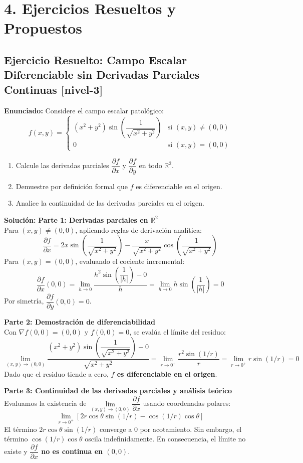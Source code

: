 \documentclass[11pt]{article}
\newenvironment{ejercicios}{%
  \section*{4. Ejercicios Resueltos y Propuestos}%
}{}
\newenvironment{ejercicioresuelto}[2]{\subsection*{Ejercicio Resuelto: #1 \small{[#2]}}}{}
\newcommand{\enunciado}[1]{\textbf{Enunciado:} #1\par\vspace{0.2cm}}
\newcommand{\solucion}[1]{\textbf{Solución:} #1\par\vspace{0.4cm}}
\begin{document}
\begin{ejercicios}
  \begin{ejercicioresuelto}{Campo Escalar Diferenciable sin Derivadas Parciales Continuas}{nivel-3}
    \enunciado{
      Considere el campo escalar patológico:
      $$ f(x,y) = \begin{cases} \left(x^2 + y^2\right) \sin\left(\dfrac{1}{\sqrt{x^2 + y^2}}\right) & \text{si } (x,y) \neq (0,0) \\[1em] 0 & \text{si } (x,y) = (0,0) \end{cases} $$
      \begin{enumerate}
        \item Calcule las derivadas parciales $\dfrac{\partial f}{\partial x}$ y $\dfrac{\partial f}{\partial y}$ en todo $\mathbb{R}^2$.
        \item Demuestre por definición formal que $f$ es diferenciable en el origen.
        \item Analice la continuidad de las derivadas parciales en el origen.
      \end{enumerate}
    }
    \solucion{
      \textbf{Parte 1: Derivadas parciales en $\mathbb{R}^2$} \\
      Para $(x,y) \neq (0,0)$, aplicando reglas de derivación analítica:
      $$ \dfrac{\partial f}{\partial x} = 2x\sin\left(\dfrac{1}{\sqrt{x^2+y^2}}\right) - \dfrac{x}{\sqrt{x^2+y^2}}\cos\left(\dfrac{1}{\sqrt{x^2+y^2}}\right) $$
      Para $(x,y) = (0,0)$, evaluando el cociente incremental:
      $$ \dfrac{\partial f}{\partial x}(0,0) = \lim\limits_{h \to 0} \dfrac{h^2 \sin\left(\dfrac{1}{|h|}\right) - 0}{h} = \lim\limits_{h \to 0} h \sin\left(\dfrac{1}{|h|}\right) = 0 $$
      Por simetría, $\dfrac{\partial f}{\partial y}(0,0) = 0$.

      \vspace{0.3cm}
      \textbf{Parte 2: Demostración de diferenciabilidad} \\
      Con $\nabla f(0,0) = (0,0)$ y $f(0,0)=0$, se evalúa el límite del residuo:
      $$ \lim\limits_{(x,y) \to (0,0)} \dfrac{(x^2+y^2)\sin\left(\dfrac{1}{\sqrt{x^2+y^2}}\right) - 0}{\sqrt{x^2+y^2}} = \lim\limits_{r \to 0^+} \dfrac{r^2 \sin(1/r)}{r} = \lim\limits_{r \to 0^+} r \sin(1/r) = 0 $$
      Dado que el residuo tiende a cero, \textbf{$f$ es diferenciable en el origen}.

      \vspace{0.3cm}
      \textbf{Parte 3: Continuidad de las derivadas parciales y análisis teórico} \\
      Evaluamos la existencia de $\lim\limits_{(x,y)\to(0,0)} \dfrac{\partial f}{\partial x}$ usando coordenadas polares:
      $$ \lim\limits_{r \to 0^+} \left[ 2r\cos\theta \sin(1/r) - \cos(1/r)\cos\theta \right] $$
      El término $2r\cos\theta \sin(1/r)$ converge a $0$ por acotamiento. Sin embargo, el término $\cos(1/r)\cos\theta$ oscila indefinidamente. En consecuencia, el límite no existe y \textbf{$\dfrac{\partial f}{\partial x}$ no es continua en $(0,0)$}.
    }
  \end{ejercicioresuelto}


\end{ejercicios}
\end{document}
